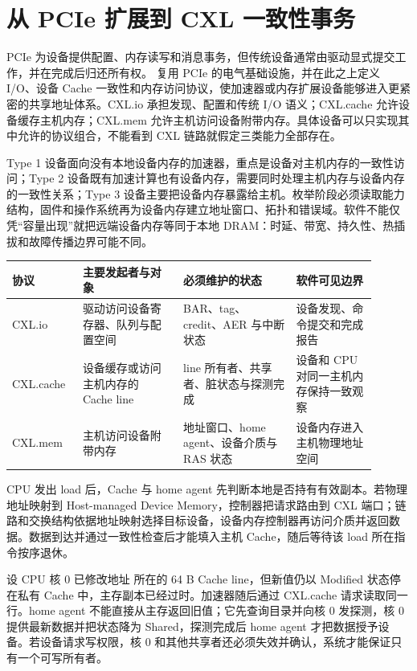 \section{从 PCIe 扩展到 CXL 一致性事务}

PCIe 为设备提供配置、内存读写和消息事务，但传统设备通常由驱动显式提交工作，并在完成后归还所有权。 复用 PCIe 的电气基础设施，并在此之上定义 I/O、设备 Cache 一致性和内存访问协议，使加速器或内存扩展设备能够进入更紧密的共享地址体系。CXL.io 承担发现、配置和传统 I/O 语义；CXL.cache 允许设备缓存主机内存；CXL.mem 允许主机访问设备附带内存。具体设备可以只实现其中允许的协议组合，不能看到 CXL 链路就假定三类能力全部存在。\cite{cxl31}

Type 1 设备面向没有本地设备内存的加速器，重点是设备对主机内存的一致性访问；Type 2 设备既有加速计算也有设备内存，需要同时处理主机内存与设备内存的一致性关系；Type 3 设备主要把设备内存暴露给主机。枚举阶段必须读取能力结构，固件和操作系统再为设备内存建立地址窗口、拓扑和错误域。软件不能仅凭“容量出现”就把远端设备内存等同于本地 DRAM：时延、带宽、持久性、热插拔和故障传播边界可能不同。

\begin{longtable}{L{0.16\linewidth}L{0.25\linewidth}L{0.29\linewidth}L{0.20\linewidth}}
\toprule
协议 & 主要发起者与对象 & 必须维护的状态 & 软件可见边界 \\
\midrule
CXL.io & 驱动访问设备寄存器、队列与配置空间 & BAR、tag、credit、AER 与中断状态 & 设备发现、命令提交和完成报告 \\\tablerowrule
CXL.cache & 设备缓存或访问主机内存的 Cache line & line 所有者、共享者、脏状态与探测完成 & 设备和 CPU 对同一主机内存保持一致观察 \\\tablerowrule
CXL.mem & 主机访问设备附带内存 & 地址窗口、home agent、设备介质与 RAS 状态 & 设备内存进入主机物理地址空间 \\
\bottomrule
\end{longtable}

CPU 发出 load 后，Cache 与 home agent 先判断本地是否持有有效副本。若物理地址映射到 Host-managed Device Memory，控制器把请求路由到 CXL 端口；链路和交换结构依据地址映射选择目标设备，设备内存控制器再访问介质并返回数据。数据到达并通过一致性检查后才能填入主机 Cache，随后等待该 load 所在指令按序退休。


设 CPU 核 0 已修改地址  所在的 64 B Cache line，但新值仍以 Modified 状态停在私有 Cache 中，主存副本已经过时。加速器随后通过 CXL.cache 请求读取同一行。home agent 不能直接从主存返回旧值；它先查询目录并向核 0 发探测，核 0 提供最新数据并把状态降为 Shared，探测完成后 home agent 才把数据授予设备。若设备请求写权限，核 0 和其他共享者还必须失效并确认，系统才能保证只有一个可写所有者。

